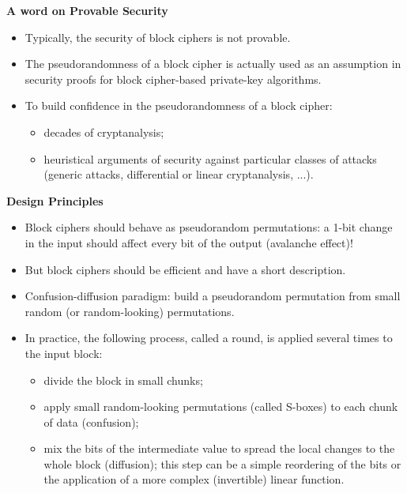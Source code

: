 \textbf{A word on Provable Security}
\begin{itemize}
    \item Typically, the security of block ciphers is not provable.
    \item The pseudorandomness of a block cipher is actually used as an assumption in security proofs for block cipher-based private-key algorithms.
    \item To build confidence in the pseudorandomness of a block cipher:
    \begin{itemize}
        \item decades of cryptanalysis;
        \item heuristical arguments of security against particular classes of attacks (generic attacks, differential or linear cryptanalysis, ...).\newline
    \end{itemize}
\end{itemize}

\newpage

\textbf{Design Principles}
\begin{itemize}
    \item Block ciphers should behave as pseudorandom permutations: a 1-bit change in the input should affect every bit of the output (avalanche effect)!
    \item But block ciphers should be efficient and have a short description.
    \item Confusion-diffusion paradigm: build a pseudorandom permutation from small random (or random-looking) permutations.
    \item In practice, the following process, called a round, is applied several times to the input block:
    \begin{itemize}
        \item divide the block in small chunks;
        \item apply small random-looking permutations (called S-boxes) to each chunk of data (confusion);
        \item mix the bits of the intermediate value to spread the local changes to the whole block (diffusion); this step can be a simple reordering of the bits or the application of a more complex (invertible) linear function.\newline
    \end{itemize}
\end{itemize}


